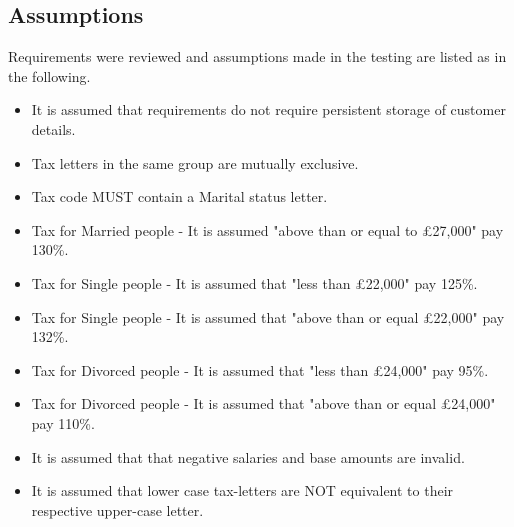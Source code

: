 \subsection{Assumptions}
Requirements were reviewed and assumptions made in the testing are listed as in the following.
\begin{itemize}
    \item It is assumed that requirements do not require persistent storage of customer details.
    \item Tax letters in the same group are mutually exclusive. 
    \item Tax code MUST contain a Marital status letter. 
    \item Tax for Married people - It is assumed "above than or equal to £27,000" pay 130\%. 
    \item Tax for Single people - It is assumed that "less than £22,000" pay 125\%. 
    \item Tax for Single people - It is assumed that "above than or equal £22,000" pay 132\%. 
    \item Tax for Divorced people - It is assumed that "less than £24,000" pay 95\%.
    \item Tax for Divorced people - It is assumed that "above than or equal £24,000" pay 110\%.
    \item It is assumed that that negative salaries and base amounts are invalid.
    \item It is assumed that lower case tax-letters are NOT equivalent to their respective upper-case letter. 
\end{itemize}